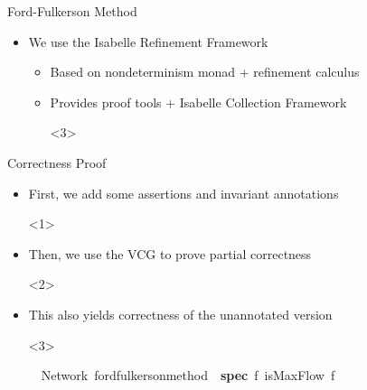 \documentclass[fleqn]{beamer}
\def\isachardoublequoteopen{}%
\def\isachardoublequoteclose{}%
\newcommand{\isainnerkeyword}[1]{{\textbf{#1}}}
\begin{document}
{\def\snippetnprf{
\isacommand{theorem}\isamarkupfalse%
\ {\isacharparenleft}\isakeyword{in}\ Network{\isacharparenright}\ {\isachardoublequoteopen}ford{\isacharunderscore}fulkerson{\isacharunderscore}method\ {\isasymle}\ {\isacharparenleft}\isainnerkeyword{spec}\ f{\isachardot}\ isMaxFlow\ f{\isacharparenright}{\isachardoublequoteclose}%
}

\begin{frame}[t]{Ford-Fulkerson Method}
  {}
  \begin{itemize}
   \item<1-> We use the Isabelle Refinement Framework
    \begin{itemize}
     \item<2-> Based on nondeterminism monad + refinement calculus
     \item<2-> Provides proof tools + Isabelle Collection Framework
      \vspace*{1em}
      
      \begin{onlyenv}<3>
        \isasnip\snippetfofu
      \end{onlyenv}

    \end{itemize}
  \end{itemize}
\end{frame}
\begin{frame}[t]{Correctness Proof}
  \begin{itemize}
   \item<1-> First, we add some assertions and invariant annotations
    \begin{onlyenv}<1>
      \vspace*{1em}
      
      \isasnipsmall\snippetfofuassn
    \end{onlyenv}
   \item<2-> Then, we use the VCG to prove partial correctness
    \begin{onlyenv}<2>
      \vspace*{1em}
      
      \isasnip\snippetproof
    \end{onlyenv}
   \item<3-> This also yields correctness of the unannotated version
    \begin{onlyenv}<3>
      \vspace*{1em}
      
      \isasnip\snippetnprf
    \end{onlyenv}
  
  \end{itemize}
\end{frame}
}
\end{document}

